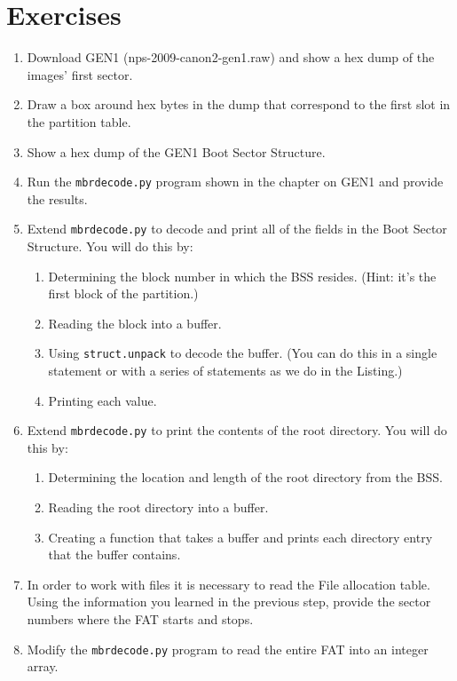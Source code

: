 \section{Exercises}

\begin{enumerate}
\item Download GEN1 (nps-2009-canon2-gen1.raw) and show a hex dump of the
  images' first sector.
\item Draw a box around hex bytes in the dump that
  correspond to the first slot in the partition table.
\item Show a hex dump of the GEN1 Boot Sector Structure.
\item Run the \texttt{mbrdecode.py} program shown in the chapter on
  GEN1 and provide the results.
\item Extend \texttt{mbrdecode.py} to decode and print all of the
  fields in the Boot Sector Structure. You will do this by:
\begin{enumerate}
  \item Determining the block number in which the BSS resides. (Hint:
    it's the first block of the partition.)
  \item Reading the block into a buffer.
  \item Using \texttt{struct.unpack} to decode the buffer. (You
  can do this in a single statement or with a series of statements as
  we do in the Listing.)
  \item Printing each value. 
\end{enumerate}


\item Extend \texttt{mbrdecode.py} to print the contents of the root
  directory.  You will do this by:
\begin{enumerate}
  \item Determining the location and length of the root directory
    from the BSS.
  \item Reading the root directory into a buffer.
  \item Creating a function that takes a buffer and prints each
    directory entry that the buffer contains. 
\end{enumerate}  

\item In order to work with files it is necessary to read the File
  allocation table. Using the information you learned in the previous
  step, provide the sector numbers where the FAT starts and stops.

\item Modify the \texttt{mbrdecode.py} program to read the
  entire FAT into an integer array. 


\end{enumerate}
